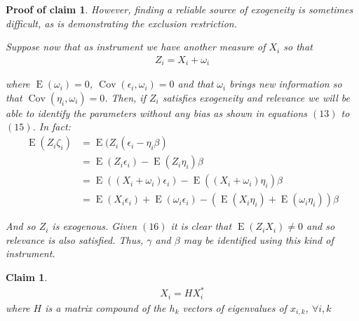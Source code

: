 \documentclass[10pt]{article}
\newtheorem{claim}{Claim}
\newtheorem{claimproof}{Proof of claim}[claim]
\def\b{\beta}
\begin{document}
\begin{claimproof}
                However, finding a reliable source of exogeneity is sometimes difficult, as is demonstrating the exclusion restriction.
                
                Suppose now that as instrument we have another measure of $X_i$ so that
                \begin{align}
                    Z_i=X_i+\omega_i
                \end{align}
                
                where $\operatorname{E}(\omega_i)=0$, $\operatorname{Cov}(\epsilon_i,\omega_i)=0$ and that $\omega_i$ brings new information so that $\operatorname{Cov}(\eta_i,\omega_i)=0$. Then, if $Z_i$ satisfies exogeneity and relevance we will be able to identify the parameters without any bias as shown in equations $(13)$ to $(15)$. In fact:
                \begin{align}
                    \operatorname{E}(Z_i\zeta_i)&=\operatorname{E}(Z_i(\epsilon_i-\eta_i\b)\\
                    &=\operatorname{E}(Z_i\epsilon_i)-\operatorname{E}(Z_i\eta_i)\b\\
                &= \operatorname{E}((X_i+\omega_i)\epsilon_i)-\operatorname{E}((X_i+\omega_i)\eta_i)\b \\
                &=\operatorname{E}(X_i\epsilon_i) + \operatorname{E}(\omega_i\epsilon_i)-(\operatorname{E}(X_i\eta_i)+\operatorname{E}(\omega_i\eta_i))\b
                \end{align}
                
                And so $Z_i$ is exogenous. Given $(16)$ it is clear that $\operatorname{E}(Z_iX_i)\neq0$ and so relevance is also satisfied. Thus, $\gamma$ and $\b$ may be identified using this kind of instrument.

        \end{claimproof}

        \begin{claim}
        \begin{align}
                    X_i=HX^*_i
                \end{align}
        where $H$ is a matrix compound of the $h_k$ vectors of eigenvalues of $x_{i,k}$, $\forall i,k$
        \end{claim}
\end{document}
